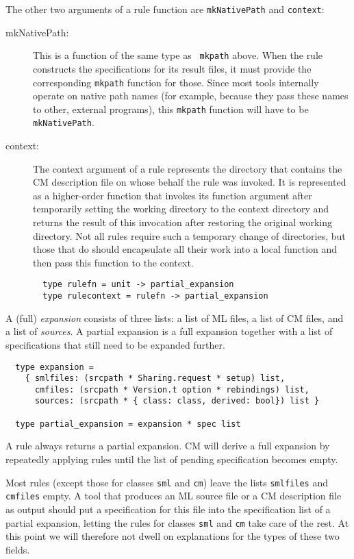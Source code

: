 The other two arguments of a rule function are {\tt mkNativePath} and
{\tt context}:

\begin{description}
\item[mkNativePath:] This is a function of the same type as {\tt
mkpath} above.  When the rule constructs the specifications for its
result files, it must provide the corresponding {\tt mkpath} function
for those.  Since most tools internally operate on native path names
(for example, because they pass these names to other, external
programs), this {\tt mkpath} function will have to be {\tt
mkNativePath}.
\item[context:] The context argument of a rule represents the
directory that contains the CM description file on whose behalf the
rule was invoked.  It is represented as a higher-order function that
invokes its function argument after temporarily setting the working
directory to the context directory and returns the result of this
invocation after restoring the original working directory.  Not all
rules require such a temporary change of directories, but those that
do should encapsulate all their work into a local function and then
pass this function to the context.
\begin{verbatim}
  type rulefn = unit -> partial_expansion
  type rulecontext = rulefn -> partial_expansion
\end{verbatim}
\end{description}

A (full) {\em expansion} consists of three lists: a list of ML files,
a list of CM files, and a list of {\em sources}.  A partial expansion
is a full expansion together with a list of specifications that still
need to be expanded further.

\begin{verbatim}
  type expansion =
    { smlfiles: (srcpath * Sharing.request * setup) list,
      cmfiles: (srcpath * Version.t option * rebindings) list,
      sources: (srcpath * { class: class, derived: bool}) list }

  type partial_expansion = expansion * spec list
\end{verbatim}

A rule always returns a partial expansion.  CM will derive a full
expansion by repeatedly applying rules until the list of pending
specification becomes empty.

Most rules (except those for classes {\tt sml} and {\tt cm}) leave the
lists {\tt smlfiles} and {\tt cmfiles} empty.  A tool that produces an
ML source file or a CM description file as output should put a
specification for this file into the specification list of a partial
expansion, letting the rules for classes {\tt sml} and {\tt cm} take
care of the rest.  At this point we will therefore not dwell on
explanations for the types of these two fields.

